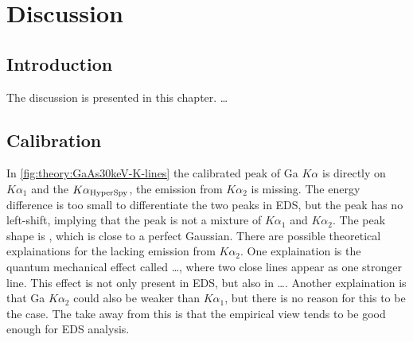 \chapter{Discussion}
\label{chap:discussion}


\section{Introduction}
\label{sec:discussion:intro}
The discussion is presented in this chapter. \dots



\section{Calibration}
\label{sec:discussion:calibration}

In \cref{fig:theory:GaAs30keV-K-lines} the calibrated peak of Ga $K\alpha$ is directly on $K\alpha_1$ and the $K\alpha_\textnormal{HyperSpy}$, the emission from $K\alpha_2$ is missing.
The energy difference is too small to differentiate the two peaks in EDS, but the peak has no left-shift, implying that the peak is not a mixture of $K\alpha_1$ and $K\alpha_2$.
The peak shape is , which is close to a perfect Gaussian.
There are possible theoretical explainations for the lacking emission from $K\alpha_2$.
One explaination is the quantum mechanical effect called \dots, where two close lines appear as one stronger line.
This effect is not only present in EDS, but also in \dots.
Another explaination is that Ga $K\alpha_2$ could also be weaker than $K\alpha_1$, but there is no reason for this to be the case.
The take away from this is that the empirical view tends to be good enough for EDS analysis.